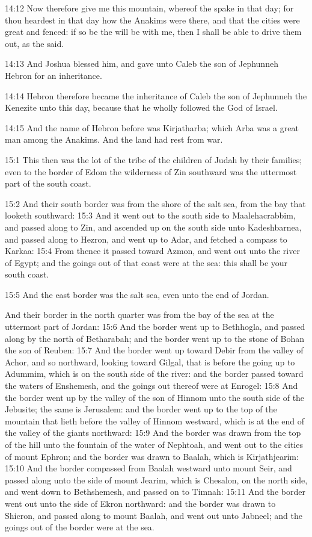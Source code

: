 14:12 Now therefore give me this mountain, whereof the \LORD spake in
that day; for thou heardest in that day how the Anakims were there,
and that the cities were great and fenced: if so be the \LORD will be
with me, then I shall be able to drive them out, as the \LORD said.

14:13 And Joshua blessed him, and gave unto Caleb the son of Jephunneh
Hebron for an inheritance.

14:14 Hebron therefore became the inheritance of Caleb the son of
Jephunneh the Kenezite unto this day, because that he wholly followed
the \LORD God of Israel.

14:15 And the name of Hebron before was Kirjatharba; which Arba was a
great man among the Anakims. And the land had rest from war.

15:1 This then was the lot of the tribe of the children of Judah by
their families; even to the border of Edom the wilderness of Zin
southward was the uttermost part of the south coast.

15:2 And their south border was from the shore of the salt sea, from
the bay that looketh southward: 15:3 And it went out to the south side
to Maalehacrabbim, and passed along to Zin, and ascended up on the
south side unto Kadeshbarnea, and passed along to Hezron, and went up
to Adar, and fetched a compass to Karkaa: 15:4 From thence it passed
toward Azmon, and went out unto the river of Egypt; and the goings out
of that coast were at the sea: this shall be your south coast.

15:5 And the east border was the salt sea, even unto the end of
Jordan.

And their border in the north quarter was from the bay of the sea at
the uttermost part of Jordan: 15:6 And the border went up to
Bethhogla, and passed along by the north of Betharabah; and the border
went up to the stone of Bohan the son of Reuben: 15:7 And the border
went up toward Debir from the valley of Achor, and so northward,
looking toward Gilgal, that is before the going up to Adummim, which
is on the south side of the river: and the border passed toward the
waters of Enshemesh, and the goings out thereof were at Enrogel: 15:8
And the border went up by the valley of the son of Hinnom unto the
south side of the Jebusite; the same is Jerusalem: and the border went
up to the top of the mountain that lieth before the valley of Hinnom
westward, which is at the end of the valley of the giants northward:
15:9 And the border was drawn from the top of the hill unto the
fountain of the water of Nephtoah, and went out to the cities of mount
Ephron; and the border was drawn to Baalah, which is Kirjathjearim:
15:10 And the border compassed from Baalah westward unto mount Seir,
and passed along unto the side of mount Jearim, which is Chesalon, on
the north side, and went down to Bethshemesh, and passed on to Timnah:
15:11 And the border went out unto the side of Ekron northward: and
the border was drawn to Shicron, and passed along to mount Baalah, and
went out unto Jabneel; and the goings out of the border were at the
sea.

